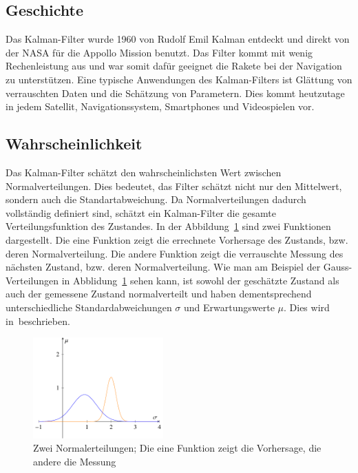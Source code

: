 \subsection{Geschichte}
Das Kalman-Filter wurde 1960 von Rudolf Emil Kalman entdeckt und direkt von der NASA für die Appollo Mission benutzt.
Das Filter kommt mit wenig Rechenleistung aus und war somit dafür geeignet die Rakete bei der Navigation zu unterstützen. 
Eine typische Anwendungen des Kalman-Filters ist Glättung von verrauschten Daten und die Schätzung von Parametern. Dies kommt heutzutage in jedem Satellit, Navigationssystem, Smartphones und Videospielen vor.

\subsection{Wahrscheinlichkeit}
Das Kalman-Filter schätzt den wahrscheinlichsten Wert zwischen Normalverteilungen.
Dies bedeutet, das Filter schätzt nicht nur den Mittelwert, sondern auch die Standartabweichung.
Da Normalverteilungen dadurch vollständig definiert sind, schätzt ein Kalman-Filter die gesamte Verteilungsfunktion des Zustandes.
In der Abbildung~\ref{erdbeben: Zwei Normalverteilungen} sind zwei Funktionen dargestellt. 
Die eine Funktion zeigt die errechnete Vorhersage des Zustands, bzw. deren Normalverteilung. 
Die andere Funktion zeigt die verrauschte Messung des nächsten Zustand, bzw. deren Normalverteilung. 
Wie man am Beispiel der Gauss-Verteilungen in Abblidung~\ref{erdbeben: Zwei Normalverteilungen} sehen kann, ist sowohl der geschätzte Zustand als auch der gemessene Zustand normalverteilt und haben dementsprechend unterschiedliche Standardabweichungen $\sigma$ und Erwartungswerte $\mu$. Dies wird in~\cite{erdbeben:aragher_understanding_2012}beschrieben.
\begin{figure}
 \begin{center}
 \includegraphics[width=5cm]{papers/erdbeben/Gausskurve2.pdf}
 \caption{Zwei Normalerteilungen; Die eine Funktion zeigt die Vorhersage, die andere die Messung}
    \label{erdbeben: Zwei Normalverteilungen}
 \end{center}
\end{figure}
